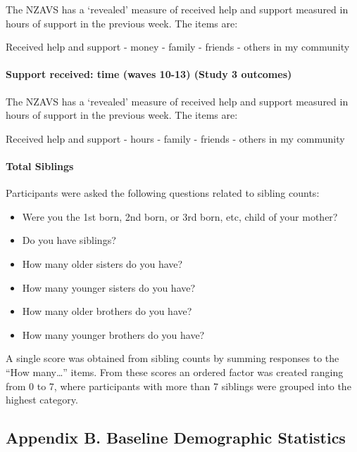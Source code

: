 \documentclass[
  singlecolumn]{article}
\let\oldparagraph\paragraph
\renewcommand{\paragraph}[1]{\oldparagraph{#1}\mbox{}}
\providecommand{\tightlist}{%
  \setlength{\itemsep}{0pt}\setlength{\parskip}{0pt}}\usepackage{longtable,booktabs,array}
\begin{document}
The NZAVS has a `revealed' measure of received help and support measured
in hours of support in the previous week. The items are:

Received help and support - money - family - friends - others in my
community

\paragraph{Support received: time (waves 10-13) (Study 3
outcomes)}\label{support-received-time-waves-10-13-study-3-outcomes}

The NZAVS has a `revealed' measure of received help and support measured
in hours of support in the previous week. The items are:

Received help and support - hours - family - friends - others in my
community

\paragraph{Total Siblings}\label{total-siblings}

Participants were asked the following questions related to sibling
counts:

\begin{itemize}
\tightlist
\item
  Were you the 1st born, 2nd born, or 3rd born, etc, child of your
  mother?
\item
  Do you have siblings?
\item
  How many older sisters do you have?
\item
  How many younger sisters do you have?
\item
  How many older brothers do you have?
\item
  How many younger brothers do you have?
\end{itemize}

A single score was obtained from sibling counts by summing responses to
the ``How many\ldots{}'' items. From these scores an ordered factor was
created ranging from 0 to 7, where participants with more than 7
siblings were grouped into the highest category.

\subsection{Appendix B. Baseline Demographic
Statistics}\label{appendix-demographics}

\begin{table}

\caption{\label{tbl-B}}

\centering{

\captionsetup{labelsep=none}

}

\end{table}%
\end{document}
